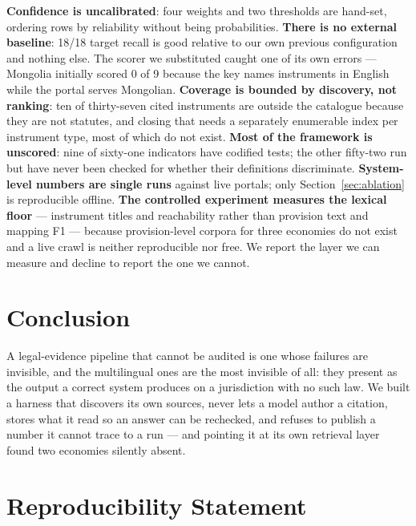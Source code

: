 \documentclass{article}
\begin{document}
\textbf{Confidence is uncalibrated}: four weights and two thresholds are
hand-set, ordering rows by reliability without being probabilities.
\textbf{There is no external baseline}: 18/18 target recall is good relative to
our own previous configuration and nothing else. The scorer we substituted caught
one of its own errors --- Mongolia initially scored 0 of 9 because the key names
instruments in English while the portal serves Mongolian. \textbf{Coverage is bounded by discovery, not ranking}:
ten of thirty-seven cited instruments are outside the catalogue because they are
not statutes, and closing that needs a separately enumerable index per instrument
type, most of which do not exist. \textbf{Most of the framework is unscored}: nine
of sixty-one indicators have codified tests; the other fifty-two run but have
never been checked for whether their definitions discriminate.
\textbf{System-level numbers are single runs} against live portals; only
Section~\ref{sec:ablation} is reproducible offline. \textbf{The controlled
experiment measures the lexical floor} --- instrument titles and reachability
rather than provision text and mapping F1 --- because provision-level corpora for
three economies do not exist and a live crawl is neither reproducible nor free.
We report the layer we can measure and decline to report the one we cannot.

\section{Conclusion}

A legal-evidence pipeline that cannot be audited is one whose failures are
invisible, and the multilingual ones are the most invisible of all: they present
as the output a correct system produces on a jurisdiction with no such law. We
built a harness that discovers its own sources, never lets a model author a
citation, stores what it read so an answer can be rechecked, and refuses to
publish a number it cannot trace to a run --- and pointing it at its own
retrieval layer found two economies silently absent.

\label{ledger:endmain}


\section*{Reproducibility Statement}
\end{document}
